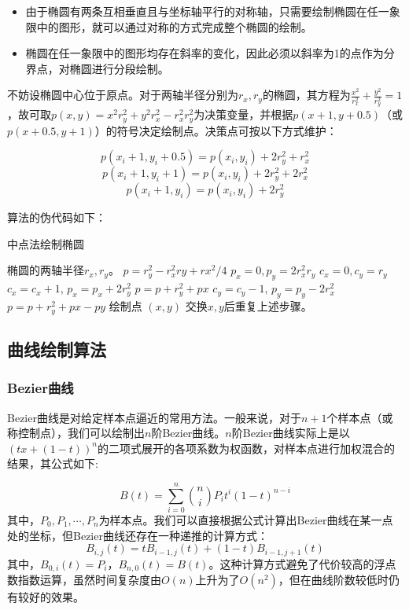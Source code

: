 \documentclass[a4paper,12pt]{article}
\begin{document}
\begin{itemize}
	\item 由于椭圆有两条互相垂直且与坐标轴平行的对称轴，只需要绘制椭圆在任一象限中的图形，就可以通过对称的方式完成整个椭圆的绘制。
	\item 椭圆在任一象限中的图形均存在斜率的变化，因此必须以斜率为1的点作为分界点，对椭圆进行分段绘制。
\end{itemize}
不妨设椭圆中心位于原点。对于两轴半径分别为$r_x,r_y$的椭圆，其方程为$\frac{x^2}{r_x^2} + \frac{y^2}{r_y^2} = 1$，故可取$p(x, y) = x^2r_y^2 + y^2 r_x^2 - r_x^2r_y^2$为决策变量，并根据$p(x+1, y+0.5)$（或$p(x+0.5, y+1)$）的符号决定绘制点。决策点可按以下方式维护：

$$ p(x_i+1, y_i+0.5) = p(x_i, y_i) + 2r_y^2 + r_x^2 $$
$$ p(x_i+1, y_i+1) = p(x_i, y_i) + 2r_y^2 + 2r_x^2 $$
$$ p(x_i+1, y_i) = p(x_i, y_i) + 2r_y^2 $$

算法的伪代码如下：

\begin{algorithm}[htb] 
	\caption{中点法绘制椭圆} 
	\label{alg:Midpoint} 
	\begin{algorithmic}[1] 
		\Require 
		椭圆的两轴半径$r_x, r_y$。
		\State $p = r_y^2 - r_x^2 ry + rx^2 / 4$
		\State $p_x = 0, p_y = 2r_x^2r_y$
		\State $c_x = 0, c_y = r_y$
		\State $c_x = c_x + 1$, $p_x = p_x + 2 r_y^2$ 
		\State $p = p + r_y^2 + px$
		\Else
		\State $c_y = c_y - 1$, $p_y = p_y - 2 r_x^2$
		\State $p = p + r_y^2 + px - py$
		\EndIf
		\State 绘制点 $(x, y)$
		\EndWhile
		\State 交换$x, y$后重复上述步骤。
	\end{algorithmic} 
\end{algorithm}

\subsection{曲线绘制算法}
\subsubsection{Bezier曲线}
Bezier曲线是对给定样本点逼近的常用方法。一般来说，对于$n+1$个样本点（或称控制点），我们可以绘制出$n$阶Bezier曲线。$n$阶Bezier曲线实际上是以$(tx+(1-t))^n$的二项式展开的各项系数为权函数，对样本点进行加权混合的结果，其公式如下:

$$ B(t) = \sum_{i=0}^n \binom{n}{i} P_i t^i (1-t)^{n-i} $$
其中，$P_0, P_1, \cdots, P_n$为样本点。我们可以直接根据公式计算出Bezier曲线在某一点处的坐标，但Bezier曲线还存在一种递推的计算方式：
$$ B_{i, j}(t) = t B_{i-1, j}(t) + (1-t) B_{i-1, j+1}(t) $$
其中，$B_{0, i}(t) = P_i$，$B_{n, 0}(t) = B(t)$。这种计算方式避免了代价较高的浮点数指数运算，虽然时间复杂度由$O(n)$上升为了$O(n^2)$，但在曲线阶数较低时仍有较好的效果。
\end{document}
